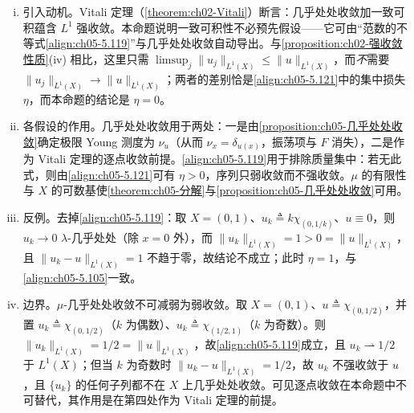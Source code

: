 \documentclass[../../main.tex]{subfiles}
\begin{document}
\begin{remark}\label{remark:ch05-强收敛注}
\begin{enumerate}[(i)]
\item 引入动机。Vitali 定理（\cref{theorem:ch02-Vitali}）断言：几乎处处收敛加一致可积蕴含 $L^1$ 强收敛。本命题说明一致可积性不必预先假设——它可由“范数的不等式\eqref{align:ch05-5.119}”与几乎处处收敛自动导出。与\cref{proposition:ch02-强收敛性质}(iv) 相比，这里只需 $\limsup_j\|u_j\|_{L^1(X)}\leqslant\|u\|_{L^1(X)}$，而\emph{不}需要 $\|u_j\|_{L^1(X)}\to\|u\|_{L^1(X)}$；两者的差别恰是\eqref{align:ch05-5.121}中的集中损失 $\eta$，而本命题的结论是 $\eta=0$。

\item 各假设的作用。几乎处处收敛用于两处：一是由\cref{proposition:ch05-几乎处处收敛}确定极限 Young 测度为 $\nu_{u}$（从而 $\nu_x=\delta_{u(x)}$，振荡项与 $F$ 消失），二是作为 Vitali 定理的逐点收敛前提。\eqref{align:ch05-5.119}用于排除质量集中：若无此式，则由\eqref{align:ch05-5.121}可有 $\eta>0$，序列只弱收敛而不强收敛。$\mu$ 的有限性与 $X$ 的可数基使\cref{theorem:ch05-分解}与\cref{proposition:ch05-几乎处处收敛}可用。

\item 反例。去掉\eqref{align:ch05-5.119}：取 $X=(0,1)$、$u_k\triangleq k\chi_{(0,1/k)}$、$u\equiv0$，则 $u_k\to0$ $\lambda$-几乎处处（除 $x=0$ 外），而 $\|u_k\|_{L^1(X)}=1>0=\|u\|_{L^1(X)}$，且 $\|u_k-u\|_{L^1(X)}=1$ 不趋于零，故结论不成立；此时 $\eta=1$，与\eqref{align:ch05-5.105}一致。

\item 边界。$\mu$-几乎处处收敛不可减弱为弱收敛。取 $X=(0,1)$、$u\triangleq\chi_{(0,1/2)}$，并置 $u_k\triangleq\chi_{(0,1/2)}$（$k$ 为偶数）、$u_k\triangleq\chi_{(1/2,1)}$（$k$ 为奇数）。则 $\|u_k\|_{L^1(X)}=1/2=\|u\|_{L^1(X)}$，故\eqref{align:ch05-5.119}成立，且 $u_k\rightharpoonup1/2$ 于 $L^1(X)$；但当 $k$ 为奇数时 $\|u_k-u\|_{L^1(X)}=1/2$，故 $u_k$ 不强收敛于 $u$，且 $\{u_k\}$ 的任何子列都不在 $X$ 上几乎处处收敛。可见逐点收敛在本命题中不可替代，其作用是在第四处作为 Vitali 定理的前提。
\end{enumerate}
\end{remark}
\end{document}

